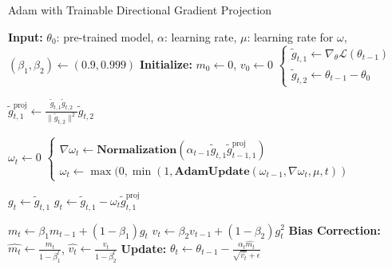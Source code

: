 \begin{algorithm}[!h]
\caption{Adam with Trainable Directional Gradient Projection}
\label{algo:digrap}
\begin{algorithmic}[1]
\State \textbf{Input:} $\theta_0$: pre-trained model, $\alpha$: learning rate, $\mu$: learning rate for $\omega$, $(\beta_1, \beta_2) \leftarrow (0.9, 0.999)$
\State \textbf{Initialize:} $m_0 \leftarrow 0$, $v_0 \leftarrow 0$
    \State 
    $\begin{cases}
    \tilde{g}_{t, 1} \leftarrow \nabla_{\theta} \mathcal{L}(\theta_{t-1}) \\
    \tilde{g}_{t, 2} \leftarrow \theta_{t-1} - \theta_0
    \end{cases}$
    
    \State $\tilde{g}_{t, 1}^{\text{proj}} \leftarrow \frac{\tilde{g}_{t, 1} \tilde{g}_{t, 2}}{\|\tilde{g}_{t, 2}\|^2} \tilde{g}_{t, 2}$

        \State $\omega_t \leftarrow 0$ 
    \Else
        \State 
        $\begin{cases}
        \nabla\omega_{t} \leftarrow \textbf{Normalization}(\alpha_{t-1} \tilde{g}_{t,1} \tilde{g}_{t-1, 1}^{\text{proj}}) \\
        \omega_{t} \leftarrow \max(0, \min(1, \textbf{AdamUpdate}(\omega_{t-1}, \nabla \omega_{t}, \mu, t))
        \end{cases}$
    \EndIf
    
        \State $g_t \leftarrow \tilde{g}_{t,1}$
    \Else
        \State 
        $
        g_{t} \leftarrow \tilde{g}_{t, 1} - \omega_{t}\tilde{g}_{t, 1}^{\text{proj}}
        $
    \EndIf
    
    \State $m_t \leftarrow \beta_1 m_{t-1} + (1 - \beta_1) g_t$
    \State $v_t \leftarrow \beta_2 v_{t-1} + (1 - \beta_2) g_t^2$
    \State \textbf{Bias Correction:} $\widehat{m_t} \leftarrow \frac{m_t}{1 - \beta_1^t}$, $\widehat{v_t} \leftarrow \frac{v_t}{1 - \beta_2^t}$
    \State \textbf{Update:} $\theta_t \leftarrow \theta_{t-1} - \frac{\alpha_t \widehat{m_t}}{\sqrt{\widehat{v_t}} + \epsilon}$
\EndFor
\end{algorithmic}
\end{algorithm}
